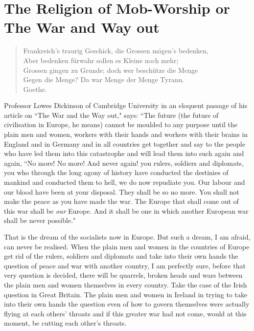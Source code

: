 \chapter[The Religion of Mob-Worship]{The Religion of Mob-Worship or The War and Way out}

\begin{quote} \footnotesize
    Frankreich's traurig Geschick, die Grossen  m\"ogen's bedenken,\\
    Aber bedenken f\"urwahr sollen es Kleine noch mehr;\\
    Grossen gingen zu Grunde; doch wer besch\"utze die Menge \\
    Gegen die Menge? Da war Menge der Menge Tyrann. \\
\hfill Goethe\cite{num27}.
\end{quote}

Professor Lowes Dickinson  of Cambridge University in an eloquent passage of his article on ``The War and the Way out," says: ``The future (the future of civilisation in Europe, he means) cannot be moulded to any purpose until the plain men and women, workers with their hands and workers with their brains in England and in Germany and in all countries get together and say to the people who have led them into this catastrophe and will lead them into such again and again, ``No more! No more! And never again! you rulers, soldiers and diplomats, you who through the long agony of history have conducted the destinies of mankind and conducted them to hell, we do now repudiate you.
Our labour and our blood have been at your disposal.
They shall be so no more.
You shall not make the peace as you have made the war.
The Europe that shall come out of this war shall be \emph{our} Europe.
And it shall be one in which another European war shall be never possible."

That is the dream of the socialists now in Europe.
But such a dream, I am afraid, can never be realised.
When the plain men and women in the countries of Europe get rid of the rulers, soldiers and diplomats and take into their own hands the question of peace and war with another country, I am perfectly sure, before that very question is decided, there will be quarrels, broken heads and wars between the plain men and women themselves in every country.
Take the case of the Irish question in Great Britain.
The plain men and women in Ireland in trying to take into their own hands the question even of how to govern themselves were actually flying at each others' throats and if this greater war had not come, would at this moment, be cutting each other's throats.

